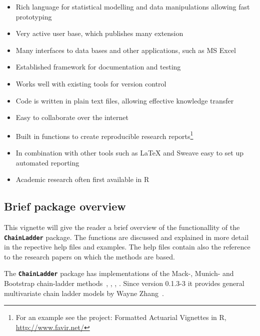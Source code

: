 \documentclass{article}
\newcommand{\chainladder}{\textbf{\texttt{ChainLadder}} }
\begin{document}
\begin{itemize}

\item Rich language for statistical modelling and data manipulations
  allowing fast prototyping  
  
\item Very active user base, which publishes many extension
 
\item Many interfaces to data bases and other applications, such as MS
  Excel
  
\item Established framework for documentation and testing 

\item Works well with existing tools for version control 

\item Code is written in plain text files, allowing effective knowledge
  transfer 

\item Easy to collaborate over the internet

\item Built in functions to create reproducible research
  reports\footnote{For an example see the project: Formatted Actuarial Vignettes in
    R, \url{http://www.favir.net/}}

\item In combination with other tools such as  {\LaTeX} and Sweave
  easy to set up automated reporting

\item Academic research often first available in R  
    
\end{itemize}


\subsection{Brief package overview}
This vignette will give the reader a brief overview of the functionallity of 
the \chainladder package. The functions are discussed and explained in 
more detail in the repective help files and examples. The help files contain 
also the reference to the research papers on which the methods are based. 

The \chainladder package has implementations of the Mack-, Munich- and 
Boot\-strap chain-ladder methods~\cite{Mack1993}, \cite{Mack1999}, 
\cite{Quarg2004}, \cite{EnglandVerrall1999}. 
Since version 0.1.3-3 it provides general multivariate 
chain ladder models by Wayne Zhang~\cite{Zhang2010a}. 
\end{document}

